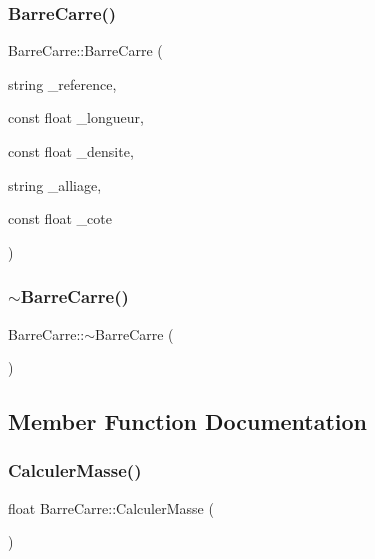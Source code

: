 \subsubsection{\texorpdfstring{Barre\+Carre()}{BarreCarre()}}
{\footnotesize\ttfamily Barre\+Carre\+::\+Barre\+Carre (\begin{DoxyParamCaption}\item[{string}]{\+\_\+reference,  }\item[{const float}]{\+\_\+longueur,  }\item[{const float}]{\+\_\+densite,  }\item[{string}]{\+\_\+alliage,  }\item[{const float}]{\+\_\+cote }\end{DoxyParamCaption})}

\mbox{\label{class_barre_carre_a82339da142c13e06c3e464612dce0a42}} 
\subsubsection{\texorpdfstring{$\sim$\+Barre\+Carre()}{~BarreCarre()}}
{\footnotesize\ttfamily Barre\+Carre\+::$\sim$\+Barre\+Carre (\begin{DoxyParamCaption}{ }\end{DoxyParamCaption})}



\subsection{Member Function Documentation}
\mbox{\label{class_barre_carre_ad290f96b7657082e3995c091a41a7a74}} 
\subsubsection{\texorpdfstring{Calculer\+Masse()}{CalculerMasse()}}
{\footnotesize\ttfamily float Barre\+Carre\+::\+Calculer\+Masse (\begin{DoxyParamCaption}{ }\end{DoxyParamCaption})}

\mbox{\label{class_barre_carre_a521fa890549009143b4cd1fc0d20ba47}} 
